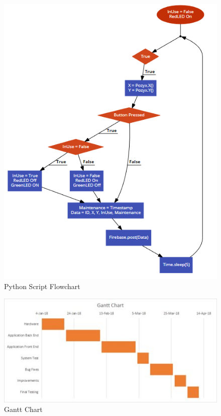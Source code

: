 \documentclass[12pt]{article}
\begin{document}
	\begin{figure}[!htb]
		\centering
		\includegraphics[scale = .75]{PythonFlowchart.PNG}
		\caption{Python Script Flowchart}
	\end{figure}

	\begin{figure}[!htb]
		\centering
		\includegraphics[scale = 1.3]{Gantt.jpg}
		\caption{Gantt Chart}
	\end{figure}
\end{document}
